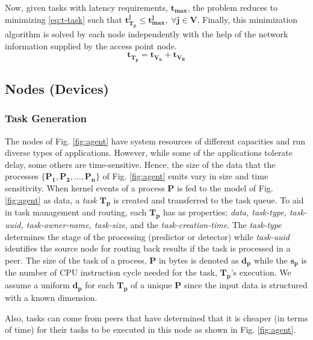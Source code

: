 Now, given tasks with latency requirements, $ \bm{t_{max}} $, 
the problem reduces to minimizing \eqref{eq:t-task} such that 
${ \bm{t_{T_p}^j\leq t_{max}^j, \; \forall j \in V }} $. 
Finally, this minimization algorithm is solved by each 
node independently with the help of the network information 
supplied by the access point node.
\begin{equation}
\bm{t_{T_p} = t_{V_{n}} + t_{V_{E}} } 
\label{eq:t-task}
\end{equation}
\subsection{Nodes (Devices)}
\subsubsection{Task Generation}
\label{subsec:task-generation}
The nodes of Fig. \ref{fig:agent} have 
system resources of different capacities and run diverse 
types of applications. However, while some of the 
applications tolerate delay, some others are time-sensitive. 
Hence, the size of the data that the processes $ 
\bm{\{P_1,P_2,...,P_n\}} $ of 
Fig. \ref{fig:agent} emits vary in size and time sensitivity. 
When kernel events of a process $ \bm{P} $ is fed to the 
model of Fig. \ref{fig:agent} as data, a \emph{task} $ 
\bm{T_{p}} $ is created and transferred to the task queue. To 
aid in task management and routing, each $ \bm{T_p} $ has as 
properties; \emph{data, task-type, task-uuid, 
	task-owner-name, task-size}, and the 
\emph{task-creation-time}. The 
\emph{task-type} determines the stage of the processing 
(predictor or detector) while \emph{task-uuid} identifies the 
source node for routing back results if the task is 
processed in a peer. The size of the task of a process, $ 
\bm{P} $ in bytes is denoted 
as $ \bm{d_p} $ while the $ \bm{s_{p}} $ is the number of CPU 
instruction 
cycle 
needed for the task, $ \bm{T_p} $'s execution. We assume a 
uniform $ 
\bm{d_p} $ for each $ \bm{T_p} $ of a unique $ \bm{P} $ since 
the input data is structured with a known dimension.
\par
Also, tasks can come from peers that have determined that it 
is cheaper (in terms of time) for their tasks to be executed 
in this node as shown in Fig. \ref{fig:agent}.  
